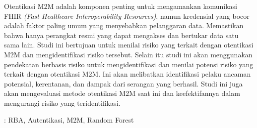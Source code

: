 Otentikasi M2M adalah komponen penting untuk mengamankan komunikasi
FHIR \textit{ (Fast Healthcare Interoperability Resources)}, namun kredensial yang bocor
adalah faktor paling umum yang menyebabkan pelanggaran data. Memastikan
bahwa hanya perangkat resmi yang dapat mengakses dan bertukar data satu sama
lain. Studi ini bertujuan untuk menilai risiko yang terkait dengan otentikasi M2M
dan mengidentifikasi risiko tersebut.
Selain itu studi ini akan menggunakan pendekatan berbasis risiko untuk
mengidentifikasi dan menilai potensi risiko yang terkait dengan otentikasi M2M.
Ini akan melibatkan identifikasi pelaku ancaman potensial, kerentanan, dan dampak
dari serangan yang berhasil. Studi ini juga akan mengevaluasi metode otentikasi
M2M saat ini dan keefektifannya dalam mengurangi risiko yang teridentifikasi.

 : RBA, Autentikasi, M2M, Random Forest
